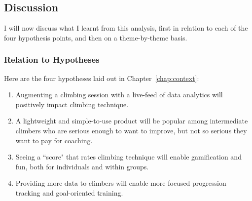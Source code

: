 \subsection{Discussion}
I will now discuss what I learnt from this analysis, first in relation to each of the four hypothesis points, and then on a theme-by-theme basis.


\subsubsection{Relation to Hypotheses}
Here are the four hypotheses laid out in Chapter~\ref{chap:context}:
\begin{enumerate}
    \item Augmenting a climbing session with a live-feed of data analytics will positively impact climbing technique.
    \item A lightweight and simple-to-use product will be popular among intermediate climbers who are serious enough to want to improve, but not so serious they want to pay for coaching.
    \item Seeing a ``score" that rates climbing technique will enable gamification and fun, both for individuals and within groups.
    \item Providing more data to climbers will enable more focused progression tracking and goal-oriented training.
\end{enumerate}

